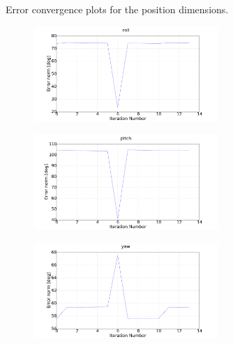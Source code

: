 \begin{figure}
\begin{subfigure}{0.48\textwidth}
\begin{subfigure}{\textwidth}
    \end{subfigure}
    \caption{Error convergence plots for the position dimensions.}
  \end{subfigure}
  \begin{subfigure}{0.48\textwidth}
    \begin{subfigure}{\textwidth}
      \includegraphics[clip, trim = 100 0 120 0, width=\textwidth]{figures/chapter3/err_roll}
    \end{subfigure}
    \begin{subfigure}{\textwidth}
      \includegraphics[clip, trim = 100 0 120 0, width=\textwidth]{figures/chapter3/err_pitch}
    \end{subfigure}
    \begin{subfigure}{\textwidth}
      \includegraphics[clip, trim = 100 0 120 0, width=\textwidth]{figures/chapter3/err_yaw}

\end{subfigure}
\end{subfigure}
\end{figure}
